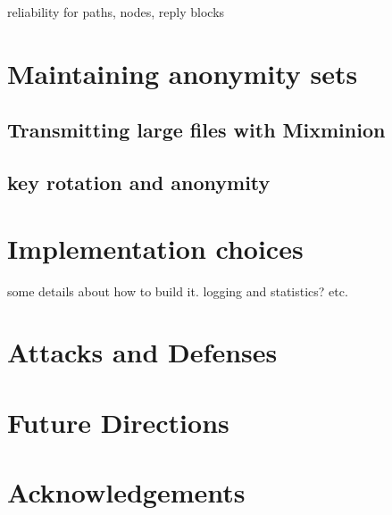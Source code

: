 \documentclass{llncs}
\begin{document}
reliability for paths, nodes, reply blocks


\section{Maintaining anonymity sets}

\subsection{Transmitting large files with Mixminion}

\subsection{key rotation and anonymity}


\section{Implementation choices}

some details about how to build it. logging and statistics? etc.


\section{Attacks and Defenses}


\section{Future Directions}


\section*{Acknowledgements}


 
\end{document}
